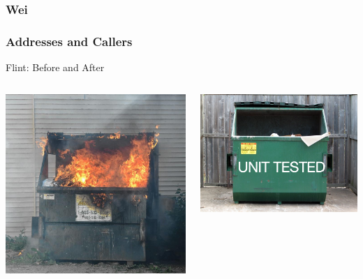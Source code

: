 \documentclass{beamer}
\begin{document}
\begin{frame}
\frametitle{Wei}
\end{frame}

\begin{frame}
\frametitle{Addresses and Callers}
\end{frame}


\begin{frame}{Flint: Before and After}
\begin{columns}
    \begin{column}{0.5\textwidth}
        \includegraphics[scale=0.5]{figures/flint-fire.jpg}
    \end{column}
    \begin{column}{0.5\textwidth}
        \includegraphics[scale=0.2]{figures/flint-after.jpg}
    \end{column}
\end{columns}
\end{frame}
\end{document}
